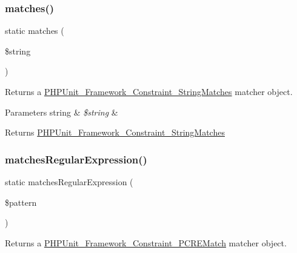 \subsubsection{\texorpdfstring{matches()}{matches()}}
{\footnotesize\ttfamily static matches (\begin{DoxyParamCaption}\item[{}]{\$string }\end{DoxyParamCaption})\hspace{0.3cm}{\ttfamily [static]}}

Returns a \mbox{\hyperlink{class_p_h_p_unit___framework___constraint___string_matches}{P\+H\+P\+Unit\+\_\+\+Framework\+\_\+\+Constraint\+\_\+\+String\+Matches}} matcher object.


\begin{DoxyParams}[1]{Parameters}
string & {\em \$string} & \\
\hline
\end{DoxyParams}
\begin{DoxyReturn}{Returns}
\mbox{\hyperlink{class_p_h_p_unit___framework___constraint___string_matches}{P\+H\+P\+Unit\+\_\+\+Framework\+\_\+\+Constraint\+\_\+\+String\+Matches}} 
\end{DoxyReturn}
\mbox{\label{class_p_h_p_unit___framework___assert_a9dfc313cd4f7d2a4fcc55bd5a67b067b}} 
\subsubsection{\texorpdfstring{matches\+Regular\+Expression()}{matchesRegularExpression()}}
{\footnotesize\ttfamily static matches\+Regular\+Expression (\begin{DoxyParamCaption}\item[{}]{\$pattern }\end{DoxyParamCaption})\hspace{0.3cm}{\ttfamily [static]}}

Returns a \mbox{\hyperlink{class_p_h_p_unit___framework___constraint___p_c_r_e_match}{P\+H\+P\+Unit\+\_\+\+Framework\+\_\+\+Constraint\+\_\+\+P\+C\+R\+E\+Match}} matcher object.


